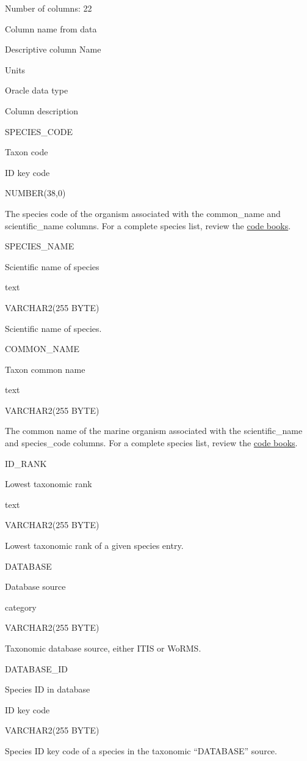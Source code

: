 \documentclass[
  letterpaper,
  oneside,
  open=any]{scrbook}
\begin{document}
Number of columns: 22

Column name from data

Descriptive column Name

Units

Oracle data type

Column description

SPECIES\_CODE

Taxon code

ID key code

NUMBER(38,0)

The species code of the organism associated with the common\_name and
scientific\_name columns. For a complete species list, review the
\href{https://www.fisheries.noaa.gov/resource/document/groundfish-survey-species-code-manual-and-data-codes-manual}{code
books}.

SPECIES\_NAME

Scientific name of species

text

VARCHAR2(255 BYTE)

Scientific name of species.

COMMON\_NAME

Taxon common name

text

VARCHAR2(255 BYTE)

The common name of the marine organism associated with the
scientific\_name and species\_code columns. For a complete species list,
review the
\href{https://www.fisheries.noaa.gov/resource/document/groundfish-survey-species-code-manual-and-data-codes-manual}{code
books}.

ID\_RANK

Lowest taxonomic rank

text

VARCHAR2(255 BYTE)

Lowest taxonomic rank of a given species entry.

DATABASE

Database source

category

VARCHAR2(255 BYTE)

Taxonomic database source, either ITIS or WoRMS.

DATABASE\_ID

Species ID in database

ID key code

VARCHAR2(255 BYTE)

Species ID key code of a species in the taxonomic ``DATABASE'' source.
\end{document}
